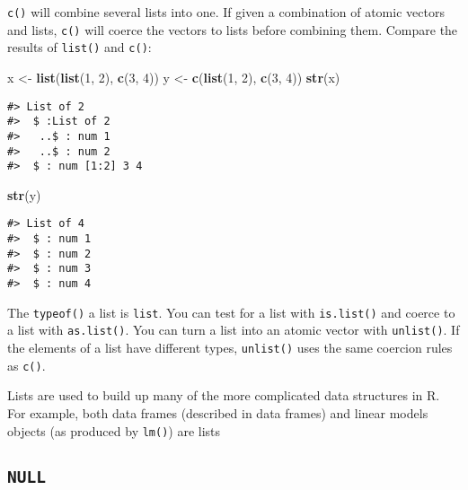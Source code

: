 \documentclass[]{book}
\newenvironment{Shaded}{\begin{snugshade}}{\end{snugshade}}
\newcommand{\KeywordTok}[1]{\textcolor[rgb]{0.13,0.29,0.53}{\textbf{#1}}}
\newcommand{\DecValTok}[1]{\textcolor[rgb]{0.00,0.00,0.81}{#1}}
\newcommand{\StringTok}[1]{\textcolor[rgb]{0.31,0.60,0.02}{#1}}
\newcommand{\NormalTok}[1]{#1}
\theoremstyle{definition}
\theoremstyle{definition}
\theoremstyle{definition}
\theoremstyle{remark}
\begin{document}
\texttt{c()} will combine several lists into one. If given a combination
of atomic vectors and lists, \texttt{c()} will coerce the vectors to
lists before combining them. Compare the results of \texttt{list()} and
\texttt{c()}:

\begin{Shaded}
\begin{Highlighting}[]
\NormalTok{x <-}\StringTok{ }\KeywordTok{list}\NormalTok{(}\KeywordTok{list}\NormalTok{(}\DecValTok{1}\NormalTok{, }\DecValTok{2}\NormalTok{), }\KeywordTok{c}\NormalTok{(}\DecValTok{3}\NormalTok{, }\DecValTok{4}\NormalTok{))}
\NormalTok{y <-}\StringTok{ }\KeywordTok{c}\NormalTok{(}\KeywordTok{list}\NormalTok{(}\DecValTok{1}\NormalTok{, }\DecValTok{2}\NormalTok{), }\KeywordTok{c}\NormalTok{(}\DecValTok{3}\NormalTok{, }\DecValTok{4}\NormalTok{))}
\KeywordTok{str}\NormalTok{(x)}
\end{Highlighting}
\end{Shaded}

\begin{verbatim}
#> List of 2
#>  $ :List of 2
#>   ..$ : num 1
#>   ..$ : num 2
#>  $ : num [1:2] 3 4
\end{verbatim}

\begin{Shaded}
\begin{Highlighting}[]
\KeywordTok{str}\NormalTok{(y)}
\end{Highlighting}
\end{Shaded}

\begin{verbatim}
#> List of 4
#>  $ : num 1
#>  $ : num 2
#>  $ : num 3
#>  $ : num 4
\end{verbatim}

The \texttt{typeof()} a list is \texttt{list}. You can test for a list
with \texttt{is.list()} and coerce to a list with \texttt{as.list()}.
You can turn a list into an atomic vector with \texttt{unlist()}. If the
elements of a list have different types, \texttt{unlist()} uses the same
coercion rules as \texttt{c()}.

Lists are used to build up many of the more complicated data structures
in R. For example, both data frames (described in data frames) and
linear models objects (as produced by \texttt{lm()}) are lists

\subsection{\texorpdfstring{\texttt{NULL}}{NULL}}\label{null}
\end{document}
